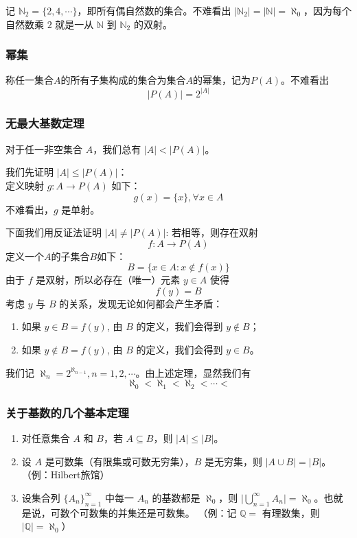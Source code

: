 \documentclass{ctexbook}
\newcommand{\no}{\noindent}
\newcommand{\pro}{\no{\bf 证明：}}
\newcommand{\EXP}{\no {\bf 例}\quad}
\newcommand{\ITEMS}{\begin{enumerate}[leftmargin=4em]}
\newcommand{\ITEME}{\end{enumerate}}
\begin{document}
\EXP 记 $\mathbb{N}_2=\{2,4,\cdots\}$，即所有偶自然数的集合。不难看出 $\lvert\mathbb{N}_2\rvert=\lvert\mathbb{N}\rvert=\aleph_0$，因为每个自然数乘 $2$ 就是一从 $\mathbb{N}$ 到 $\mathbb{N}_2$ 的双射。

\subsubsection{幂集}
称任一集合$A$的所有子集构成的集合为集合$A$的幂集，记为$P(A)$。不难看出
\[
\lvert P(A) \rvert = 2^{\lvert A \rvert}
\]

\subsubsection{无最大基数定理}

对于任一非空集合 $A$，我们总有 $\lvert A \rvert<\lvert P(A) \rvert$。
\smallskip

\pro

我们先证明 $\lvert A \rvert \le \lvert P(A) \rvert$：\\
定义映射 $g:A\rightarrow P(A)$ 如下：
\[ 
	g(x)=\{x\}, \forall x \in A
\] 
不难看出，$g$ 是单射。

下面我们用反证法证明 $\lvert A \rvert \ne \lvert P(A) \rvert$:
若相等，则存在双射
\[
	f:A\rightarrow P(A)
\]
定义一个$A$的子集合$B$如下：
\[
B = \{x\in A: x\notin f(x)\}
\]
由于 $f$ 是双射，所以必存在（唯一）元素 $y\in A$ 使得
\[
f(y) = B
\]
考虑 $y$ 与 $B$ 的关系，发现无论如何都会产生矛盾：
\ITEMS
	\item 如果 $y\in B=f(y)$, 由 $B$ 的定义，我们会得到 $y\notin B$；
	\item 如果 $y\notin B=f(y)$, 由 $B$ 的定义，我们会得到 $y\in B$。
\ITEME

\no {\bf 注} 我们记 $\aleph_n=2^{\aleph_{n-1}}, n=1, 2, \cdots$。由上述定理，显然我们有 
\[
	\aleph_0 < \aleph_1 < \aleph_2 <\cdots< 
\]

\subsubsection{关于基数的几个基本定理}
\ITEMS
	\item 对任意集合 $A$ 和 $B$，若 $A\subseteq B$，则 $\lvert A \rvert \le \lvert B \rvert$。
	\item 设 $A$ 是可数集（有限集或可数无穷集），$B$ 是无穷集，则 $\lvert A\cup B \rvert= \lvert B \rvert$。
     （例：Hilbert旅馆）
	\item 设集合列 $\{A_n\}_{n=1}^{\infty}$ 中每一 $A_n$ 的基数都是 $\aleph_0$，则 $\lvert \bigcup_{n=1}^\infty A_n \rvert=\aleph_0 $。也就是说，可数个可数集的并集还是可数集。 （例：记 $\mathbb{Q}=$ 有理数集，则 $\lvert\mathbb{Q}\rvert=\aleph_0 $） 
\ITEME
\end{document}
